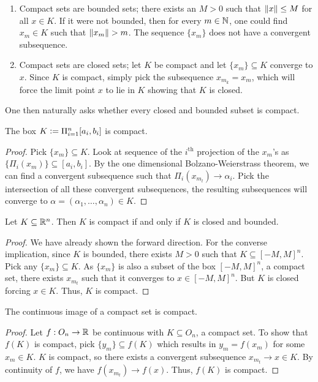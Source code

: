 \begin{remark}
    \begin{enumerate}
        \item Compact sets are bounded sets; there exists an $M > 0$ such that $\left\lVert x\right\rVert \leq M$ for all $x \in K$. If it were not bounded, then for every $m \in \mathbb{N}$, one could find $x_{m} \in K$ such that $\left\lVert x_{m}\right\rVert > m$. The sequence $\{x_{m}\}$ does not have a convergent subsequence.
        \item Compact sets are closed sets; let $K$ be compact and let $\{x_{m}\} \subseteq K$ converge to $x$. Since $K$ is compact, simply pick the subsequence $x_{m_{k}} = x_{m}$, which will force the limit point $x$ to lie in $K$ showing that $K$ is closed.
    \end{enumerate}
\end{remark}

One then naturally asks whether every closed and bounded subset is compact.

\begin{theorem}
    The box $K \vcentcolon= \Pi_{i=1}^{n} [a_{i},b_{i}]$ is compact.
\end{theorem}
\begin{proof}
    Pick $\{x_{m}\} \subseteq K$. Look at sequence of the $i^{\text{th}}$ projection of the $x_{m}$'s as $\{\Pi_{i}(x_{m})\} \subseteq [a_{i},b_{i}]$. By the one dimensional Bolzano-Weierstrass theorem, we can find a convergent subsequence such that $\Pi_{i}(x_{m_{l}}) \to \alpha_{i}$. Pick the intersection of all these convergent subsequences, the resulting subsequences will converge to $\alpha = (\alpha_{1},\ldots,\alpha_{n}) \in K$.
\end{proof}

\begin{theorem}
    Let $K \subseteq \mathbb{R}^{n}$. Then $K$ is compact if and only if $K$ is closed and bounded.
\end{theorem}
\begin{proof}
    We have already shown the forward direction. For the converse implication, since $K$ is bounded, there exists $M > 0$ such that $K \subseteq [-M,M]^{n}$. Pick any $\{x_{m}\} \subseteq K$. As $\{x_{m}\}$ is also a subset of the box $[-M,M]^{n}$, a compact set, there exists $x_{m_{t}}$ such that it converges to $x \in [-M,M]^{n}$. But $K$ is closed forcing $x \in K$. Thus, $K$ is compact.
\end{proof}

\begin{theorem}
    The continuous image of a compact set is compact.
\end{theorem}
\begin{proof}
    Let $f:O_{n} \to \mathbb{R}$ be continuous with $K \subseteq O_{n}$, a compact set. To show that $f(K)$ is compact, pick $\{y_{m}\} \subseteq f(K)$ which results in $y_{m} = f(x_{m})$ for some $x_{m} \in K$. $K$ is compact, so there exists a convergent subsequence $x_{m_{t}} \to x \in K$. By continuity of $f$, we have $f(x_{m_{t}}) \to f(x)$. Thus, $f(K)$ is compact.
\end{proof}

